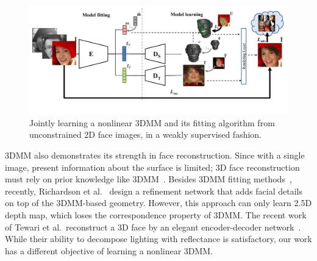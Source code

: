 \begin{figure}[t!]
\centering
\includegraphics[trim=0 40 0 15,clip, width=0.8\linewidth]{img/Architecture.pdf}
\vspace{-3mm}
\caption{\small Jointly learning a nonlinear 3DMM and its fitting algorithm from unconstrained 2D face images, in a weakly supervised fashion.}
\label{fig:architecture}
\figvspace 
\end{figure}


3DMM also demonstrates its strength in face reconstruction. 
Since with a single image, present information about the surface is limited; 3D face reconstruction must rely on prior knowledge like 3DMM~\cite{adaptive-3d-face-reconstruction-from-unconstrained-photo-collections}. 
Besides 3DMM fitting methods~\cite{blanz2003face, gu2008generative, zhang2006face,tewari2017mofa}, recently, Richardson et al.~\cite{richardson2017learning} design a refinement network that adds facial details on top of the 3DMM-based geometry.
However, this approach can only learn 2.5D depth map, which loses the correspondence property of 3DMM.
The recent work of Tewari et al.~reconstruct a 3D face by an elegant encoder-decoder network~\cite{tewari2017mofa}.
While their ability to decompose lighting with reflectance is satisfactory, our work has a different objective of learning a nonlinear 3DMM.

